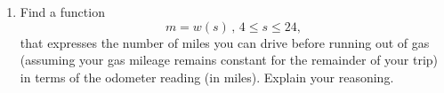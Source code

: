 \documentclass{ximera}
\begin{document}
\begin{question}
\begin{enumerate}
\begin{enumerate}
\begin{onlineOnly}
    \begin{center}
\end{center}
\end{onlineOnly}

Desmos activity available at
\href{https://www.desmos.com/calculator/ulfojucqoc}{151: Gas as a Function of Distance 9}

\item Find a function 
\[
  m =w(s) \, , \, 4\leq s \leq 24 ,
\]
that expresses the number of miles you can drive before running out of gas (assuming your gas mileage remains constant for the remainder of your trip) in terms of the odometer reading (in miles). Explain your reasoning. 

\end{enumerate}

\end{enumerate}
\end{question}
\end{document}
